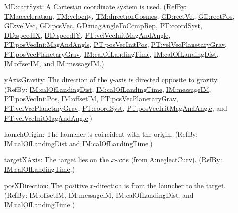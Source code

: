 \documentclass[12pt]{article}
\begin{document}
\begin{itemize}
\item[MD:cartSyst:\phantomsection\label{MD:cartSyst}]{A Cartesian coordinate system is used. (RefBy: \hyperref[TM:acceleration]{TM:acceleration}, \hyperref[TM:velocity]{TM:velocity}, \hyperref[TM:directionCosines]{TM:directionCosines}, \hyperref[GD:rectVel]{GD:rectVel}, \hyperref[GD:rectPos]{GD:rectPos}, \hyperref[GD:velVec]{GD:velVec}, \hyperref[GD:posVec]{GD:posVec}, \hyperref[GD:magAngleToCompRep]{GD:magAngleToCompRep}, \hyperref[PT:coordSyst]{PT:coordSyst}, \hyperref[DD:speedIX]{DD:speedIX}, \hyperref[DD:speedIY]{DD:speedIY}, \hyperref[PT:velVecInitMagAndAngle]{PT:velVecInitMagAndAngle}, \hyperref[PT:posVecInitMagAndAngle]{PT:posVecInitMagAndAngle}, \hyperref[PT:posVecInitPos]{PT:posVecInitPos}, \hyperref[PT:velVecPlanetaryGrav]{PT:velVecPlanetaryGrav}, \hyperref[PT:posVecPlanetaryGrav]{PT:posVecPlanetaryGrav}, \hyperref[IM:calOfLandingTime]{IM:calOfLandingTime}, \hyperref[IM:calOfLandingDist]{IM:calOfLandingDist}, \hyperref[IM:offsetIM]{IM:offsetIM}, and \hyperref[IM:messageIM]{IM:messageIM}.)}
\item[yAxisGravity:\phantomsection\label{yAxisGravity}]{The direction of the $y$-axis is directed opposite to gravity. (RefBy: \hyperref[IM:calOfLandingDist]{IM:calOfLandingDist}, \hyperref[IM:calOfLandingTime]{IM:calOfLandingTime}, \hyperref[IM:messageIM]{IM:messageIM}, \hyperref[PT:posVecInitPos]{PT:posVecInitPos}, \hyperref[IM:offsetIM]{IM:offsetIM}, \hyperref[PT:posVecPlanetaryGrav]{PT:posVecPlanetaryGrav}, \hyperref[PT:velVecPlanetaryGrav]{PT:velVecPlanetaryGrav}, \hyperref[PT:coordSyst]{PT:coordSyst}, \hyperref[PT:posVecInitMagAndAngle]{PT:posVecInitMagAndAngle}, and \hyperref[PT:velVecInitMagAndAngle]{PT:velVecInitMagAndAngle}.)}
\item[launchOrigin:\phantomsection\label{launchOrigin}]{The launcher is coincident with the origin. (RefBy: \hyperref[IM:calOfLandingDist]{IM:calOfLandingDist} and \hyperref[IM:calOfLandingTime]{IM:calOfLandingTime}.)}
\item[targetXAxis:\phantomsection\label{targetXAxis}]{The target lies on the $x$-axis (from \hyperref[neglectCurv]{A:neglectCurv}). (RefBy: \hyperref[IM:calOfLandingTime]{IM:calOfLandingTime}.)}
\item[posXDirection:\phantomsection\label{posXDirection}]{The positive $x$-direction is from the launcher to the target. (RefBy: \hyperref[IM:offsetIM]{IM:offsetIM}, \hyperref[IM:messageIM]{IM:messageIM}, \hyperref[IM:calOfLandingDist]{IM:calOfLandingDist}, and \hyperref[IM:calOfLandingTime]{IM:calOfLandingTime}.)}

\end{itemize}
\end{document}
